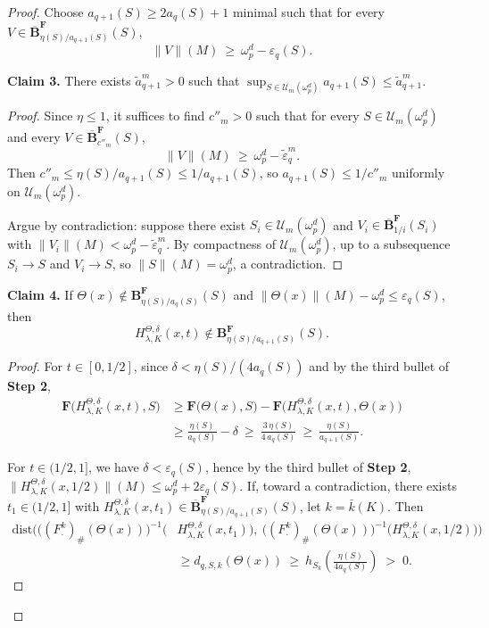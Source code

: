 \documentclass[10pt,a4paper]{amsart}
\begin{document}
\begin{proof}
Choose $a_{q+1}(S)\ge 2a_q(S)+1$ minimal such that for every $V\in\overline{\mathbf{B}}^{\mathbf F}_{\eta(S)/a_{q+1}(S)}(S)$,
\[
\|V\|(M)\ \ge\ \omega^d_p-\varepsilon_q(S).
\]

\textbf{Claim 3.} There exists $\tilde a^m_{q+1}>0$ such that $\sup_{S\in\mathcal{U}_m(\omega^d_p)} a_{q+1}(S)\le \tilde a^m_{q+1}$.
\begin{proof}
Since $\eta\le 1$, it suffices to find $c''_m>0$ such that for every $S\in\mathcal{U}_m(\omega^d_p)$ and every $V\in\overline{\mathbf{B}}^{\mathbf F}_{c''_m}(S)$,
\[
\|V\|(M)\ \ge\ \omega^d_p-\tilde\varepsilon^m_q.
\]
Then $c''_m\le \eta(S)/a_{q+1}(S)\le 1/a_{q+1}(S)$, so $a_{q+1}(S)\le 1/c''_m$ uniformly on $\mathcal{U}_m(\omega^d_p)$.

Argue by contradiction: suppose there exist $S_i\in\mathcal{U}_m(\omega^d_p)$ and $V_i\in\overline{\mathbf{B}}^{\mathbf F}_{1/i}(S_i)$ with $\|V_i\|(M)<\omega^d_p-\tilde\varepsilon^m_q$. By compactness of $\mathcal{U}_m(\omega^d_p)$, up to a subsequence $S_i\to S$ and $V_i\to S$, so $\|S\|(M)=\omega^d_p$, a contradiction.
\end{proof}

\textbf{Claim 4.} If $\Theta(x)\notin \mathbf{B}^{\mathbf F}_{\eta(S)/a_q(S)}(S)$ and $\|\Theta(x)\|(M)-\omega^d_p\le \varepsilon_q(S)$, then
\[
H^{\Theta,\delta}_{\lambda,K}(x,t)\notin \mathbf{B}^{\mathbf F}_{\eta(S)/a_{q+1}(S)}(S).
\]
\begin{proof}
For $t\in[0,1/2]$, since $\delta<\eta(S)/(4a_q(S))$ and by the third bullet of \textbf{Step 2},
\[
\begin{aligned}
\mathbf{F}\bigl(H^{\Theta,\delta}_{\lambda,K}(x,t),S\bigr)
&\ge \mathbf{F}\bigl(\Theta(x),S\bigr)
 - \mathbf{F}\bigl(H^{\Theta,\delta}_{\lambda,K}(x,t),\Theta(x)\bigr) \\
&\ge \frac{\eta(S)}{a_q(S)} - \delta
\ \ge\ \frac{3\,\eta(S)}{4\,a_q(S)}
\ \ge\ \frac{\eta(S)}{a_{q+1}(S)}.
\end{aligned}
\]


For $t\in(1/2,1]$, we have $\delta<\varepsilon_q(S)$, hence by the third bullet of \textbf{Step 2},
$\|H^{\Theta,\delta}_{\lambda,K}(x,1/2)\|(M)\le \omega^d_p+2\varepsilon_q(S)$. If, toward a contradiction, there exists $t_1\in(1/2,1]$ with
$H^{\Theta,\delta}_{\lambda,K}(x,t_1)\in\overline{\mathbf{B}}^{\mathbf F}_{\eta(S)/a_{q+1}(S)}(S)$, let $k=\bar k(K)$. Then
\[
\begin{aligned}
\mathrm{dist}\!\Big(
\bigl((F^k_{\cdot})_{\#}(\Theta(x))\bigr)^{-1}\!\bigl(&H^{\Theta,\delta}_{\lambda,K}(x,t_1)\bigr),\ 
\bigl((F^k_{\cdot})_{\#}(\Theta(x))\bigr)^{-1}\!\bigl(H^{\Theta,\delta}_{\lambda,K}(x,1/2)\bigr)
\Big) \\
&\ge d_{q,S,k}(\Theta(x))
\ \ge\ h_{S_k}\!\left(\frac{\eta(S)}{4a_q(S)}\right) \;>\; 0.
\end{aligned}
\]


\end{proof}
\end{proof}
\end{document}
